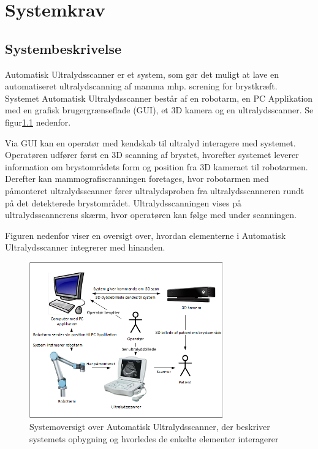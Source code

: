 \chapter{Systemkrav}\label{Systemkrav}
\section{Systembeskrivelse}
Automatisk Ultralydsscanner er et system, som gør det muligt at lave en automatiseret ultralydscanning af mamma mhp. screning for brystkræft. Systemet Automatisk Ultralydsscanner består af en robotarm, en PC Applikation med en grafisk brugergrænseflade (GUI), et 3D kamera og en ultralydsscanner. Se figur\ref{Systembeskrivelse} nedenfor. 

Via GUI kan en operatør med kendskab til ultralyd interagere med systemet. Operatøren udfører først en 3D scanning af brystet, hvorefter systemet leverer information om brystområdets form og position fra 3D kameraet til robotarmen. Derefter kan mammografiscranningen foretages, hvor robotarmen med påmonteret ultralydsscanner fører ultralydsproben fra ultralydsscanneren rundt på det detekterede brystområdet. Ultralydsscanningen vises på ultralydsscannerens skærm, hvor operatøren kan følge med under scanningen.

Figuren nedenfor viser en oversigt over, hvordan elementerne i Automatisk Ultralydsscanner integrerer med hinanden.
 
\begin{figure}[H]
    \centering
    \includegraphics[width=0.75\textwidth]{figurer/d/Kravspecifikation/Systembeskrivelse}
    \caption{Systemoversigt over Automatisk Ultralydsscanner, der beskriver systemets opbygning og hvorledes de enkelte elementer interagerer}
    \label{Systembeskrivelse}
\end{figure}

